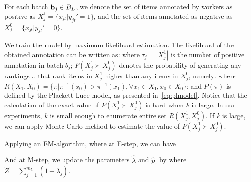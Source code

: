 For each batch ${\mathbf{b}}_j \in B_L$, we denote the set of items annotated by workers as positive as $X_{j}^1 = \{x_{jt} | y_{jt}' = 1\}$,
and the set of items annotated as negative as $X_{j}^0 = \{x_{jt} | y_{jt}' = 0\}$.


We train the model by maximum likelihood estimation.
The likelihood of the obtained annotation can be written as:
\beal{
	L = %
        \prod_{j=1}^{m_L} \biggl[
		\lambda \underbrace{
            \prod_{t=1}^{k} \eta_{jt}^{y_{jt}} (1 - \eta_{jt})^{(1 - y_{jt})}
        }_{\text{independent judging}}
		+ (1 - \lambda) \underbrace{
            p_{\tau_j} P(X_{j}^1 \succ X_{j}^0)
        }_{\text{relative judging}}
	\biggr]
}%
where $\tau_j = |X_{j}^1|$ is the number of positive annotation in batch $b_j$;
$P(X_{j}^1 \succ X_{j}^0)$ denotes the probability of generating any rankings $\pi$
that rank items in $X_{j}^1$ higher than any items in $X_{j}^0$,
namely:
%
where $R(X_1, X_0) = \{ \pi |\pi^{-1}(x_{0}) > \pi^{-1}(x_{1}),  \forall x_{1} \in X_1, x_0 \in X_0 \}$;
and $P(\pi)$ is defined by the Plackett-Luce model, as presented in~\eqref{eq:plmodel}.  
Notice that the calculation of the exact value of $P(X_{j}^1 \succ X_{j}^0)$ is hard when $k$ is large.  
In our experiments, $k$ is small enough to enumerate entire set $R(X_{j}^1, X_{j}^0)$.  
If $k$ is large, we can apply Monte Carlo method to estimate the value of $P(X_{j}^1 \succ X_{j}^0)$.  

Applying an EM-algorithm, where at E-step, we can have

And at M-step, we update the parameters $\hat{\lambda}$ and $\hat{p}_{\tau}$ by
%
where $\hat{Z} = \sum_{j=1}^{m_L} (1 - \hat{\lambda}_j)$.





